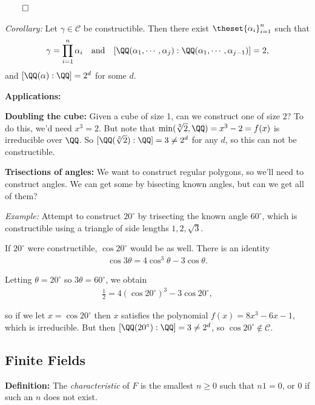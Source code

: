 \(\qed\)

\emph{Corollary:} Let \(\gamma \in \mathcal{C}\) be constructible. Then
there exist \(\theset{\alpha_i}_{i=1}^n\) such that
\begin{align*}
\gamma = \prod_{i=1}^n \alpha_i
\quad\text{and}\quad
[\QQ(\alpha_1, \cdots, \alpha_j): \QQ(\alpha_1, \cdots, \alpha_{j-1})] = 2
,\end{align*} and \([\QQ(\alpha): \QQ] = 2^d\) for some \(d\).

\textbf{Applications:}

\textbf{Doubling the cube:} Given a cube of size 1, can we construct one
of size 2? To do this, we'd need \(x^3 = 2\). But note that
\(\min(\sqrt[3]{2}, \QQ) = x^3 - 2 = f(x)\) is irreducible over \(\QQ\).
So \([\QQ(\sqrt[3]{2}): \QQ] = 3 \neq 2^d\) for any \(d\), so this can
not be constructible.

\textbf{Trisections of angles:} We want to construct regular polygons,
so we'll need to construct angles. We can get some by bisecting known
angles, but can we get all of them?

\emph{Example:} Attempt to construct \(20^\circ\) by trisecting the
known angle \(60^\circ\), which is constructible using a triangle of
side lengths \(1,2,\sqrt 3\).

If \(20^\circ\) were constructible, \(\cos 20^\circ\) would be as well.
There is an identity
\begin{align*}
\cos 3\theta = 4\cos^3 \theta - 3\cos \theta
.\end{align*}

Letting \(\theta = 20^\circ\) so \(3\theta = 60^\circ\), we obtain
\begin{align*}
\frac 1 2 = 4(\cos 20^\circ)^3 - 3\cos 20^\circ,
\end{align*}

so if we let \(x = \cos 20^\circ\) then \(x\) satisfies the polynomial
\(f(x) = 8x^3 - 6x - 1\), which is irreducible. But then
\([\QQ(20^\circ):\QQ] = 3 \neq 2^d\), so
\(\cos 20^\circ \not\in\mathcal C\).

\hypertarget{finite-fields}{%
\subsection{Finite Fields}\label{finite-fields}}

\textbf{Definition:} The \emph{characteristic} of \(F\) is the smallest
\(n\geq 0\) such that \(n1 = 0\), or \(0\) if such an \(n\) does not
exist.

